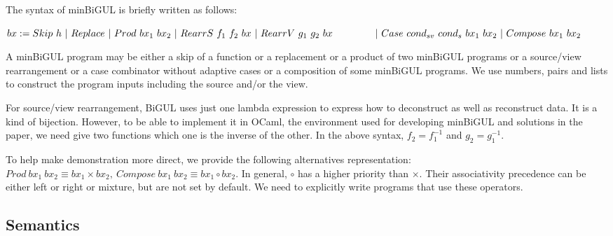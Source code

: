 The syntax of minBiGUL is briefly written as follows:

\smallvspace
    $bx := Skip \ h \
        | \ Replace \
        | \ Prod \ bx_1 \ bx_2 \
        | \ RearrS \ f_1 \ f_2 \ bx \
        | \ RearrV \ g_1 \ g_2 \ bx \\
    \qtabs{2} | \ Case \ cond_{sv} \ cond_{s} \ bx_1 \ bx_2 \
        | \ Compose \ bx_1 \ bx_2$
\smallvspace
        
A minBiGUL program may be either a skip of a function or a replacement or a product of two minBiGUL programs or a source/view rearrangement or a case combinator without adaptive cases or a composition of some minBiGUL programs. We use numbers, pairs and lists to construct the program inputs including the source and/or the view.

For source/view rearrangement, BiGUL uses just one lambda expression to express how to deconstruct as well as reconstruct data. It is a kind of bijection. However, to be able to implement it in OCaml, the environment used for developing minBiGUL and solutions in the paper, we need give two functions which one is the inverse of the other. In the above syntax, $f_2 = f_1^{-1}$ and $g_2 = g_1^{-1}$.

To help make demonstration more direct, we provide the following alternatives representation: $Prod \ bx_1 \ bx_2 \equiv bx_1 \times bx_2, \ Compose \ bx_1 \ bx_2 \equiv bx_1 \circ bx_2$. In general, $\circ$ has a higher priority than $\times$. Their associativity precedence can be either left or right or mixture, but are not set by default. We need to explicitly write programs that use these operators.

\subsection{Semantics}

